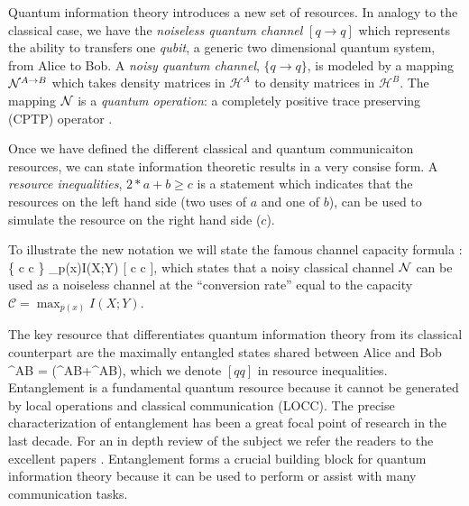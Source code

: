 \documentclass[aps,11pt,twoside,letterpaper]{article}
\def\cH{\mathcal{H}}
\theoremstyle{plain}
\theoremstyle{definition}
\begin{document}
			Quantum information theory introduces a new set of resources. 
			In analogy to the classical case, we have the \emph{noiseless quantum channel} $[q \to q]$ which 
			represents the ability to transfers one \emph{qubit}, a generic two dimensional quantum system, 
			from Alice to Bob.
			A \emph{noisy quantum channel}, $\{q \to q\}$, is modeled by a mapping ${\cal N}^{A \to B}$ 
			which takes density matrices in $\cH^A$ to density matrices in $\cH^B$.
			The mapping ${\cal N}$ is a \emph{quantum operation}: a completely positive trace preserving (CPTP) 
			operator \cite{NC04}.
		
            Once we have defined the different classical and quantum communicaiton resources,
            we can state information theoretic results in a very consise form.
            A \emph{resource inequalities}, $2*a+b \geq c$ is a statement which indicates that 
            the resources on the left hand side (two uses of $a$ and one of $b$),
            can be used to simulate the resource on the right hand side ($c$).

            To illustrate the new notation we will state the famous channel
            capacity formula \cite{S48}:
            \be
                \{ c \to c \} \geq \max_{p(x)}I(X;Y) [  c \to c ],
            \ee
            which states that a noisy classical channel ${\cal N}$ can be used as a noiseless channel
            at the ``conversion rate'' equal to the capacity $\mathcal{C} = \max_{p(x)}I(X;Y)$.

			The key resource that differentiates quantum information theory 
            from its classical counterpart are the maximally entangled states shared between 
			Alice and Bob 
			\be
				\ket{\Phi}^{AB} = (^{AB}+^{AB}),
			\ee
			which we denote $[qq]$ in resource inequalities.  
			Entanglement is a fundamental quantum resource because it cannot be generated by local operations and
			classical communication (LOCC). 
			The precise characterization of entanglement has been a great focal point of research in the last decade.
			For an in depth review of the subject we refer the readers to the excellent papers \cite{VP98, HHHH}.
			Entanglement forms a crucial building block for quantum information theory because it can be used 
			to perform or assist with many communication tasks.
\end{document}
